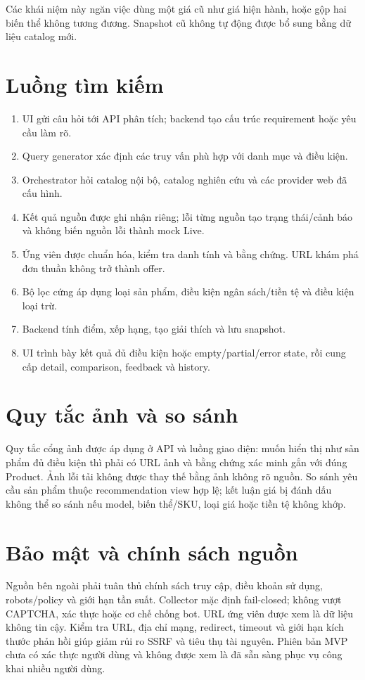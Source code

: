 Các khái niệm này ngăn việc dùng một giá cũ như giá hiện hành, hoặc gộp hai biến thể không tương đương. Snapshot cũ không tự động được bổ sung bằng dữ liệu catalog mới.

\section{Luồng tìm kiếm}

\begin{enumerate}
  \item UI gửi câu hỏi tới API phân tích; backend tạo cấu trúc requirement hoặc yêu cầu làm rõ.
  \item Query generator xác định các truy vấn phù hợp với danh mục và điều kiện.
  \item Orchestrator hỏi catalog nội bộ, catalog nghiên cứu và các provider web đã cấu hình.
  \item Kết quả nguồn được ghi nhận riêng; lỗi từng nguồn tạo trạng thái/cảnh báo và không biến nguồn lỗi thành mock Live.
  \item Ứng viên được chuẩn hóa, kiểm tra danh tính và bằng chứng. URL khám phá đơn thuần không trở thành offer.
  \item Bộ lọc cứng áp dụng loại sản phẩm, điều kiện ngân sách/tiền tệ và điều kiện loại trừ.
  \item Backend tính điểm, xếp hạng, tạo giải thích và lưu snapshot.
  \item UI trình bày kết quả đủ điều kiện hoặc empty/partial/error state, rồi cung cấp detail, comparison, feedback và history.
\end{enumerate}

\section{Quy tắc ảnh và so sánh}

Quy tắc cổng ảnh được áp dụng ở API và luồng giao diện: muốn hiển thị như sản phẩm đủ điều kiện thì phải có URL ảnh và bằng chứng xác minh gắn với đúng Product. Ảnh lỗi tải không được thay thế bằng ảnh không rõ nguồn. So sánh yêu cầu sản phẩm thuộc recommendation view hợp lệ; kết luận giá bị đánh dấu không thể so sánh nếu model, biến thể/SKU, loại giá hoặc tiền tệ không khớp.

\section{Bảo mật và chính sách nguồn}

Nguồn bên ngoài phải tuân thủ chính sách truy cập, điều khoản sử dụng, robots/policy và giới hạn tần suất. Collector mặc định fail-closed; không vượt CAPTCHA, xác thực hoặc cơ chế chống bot. URL ứng viên được xem là dữ liệu không tin cậy. Kiểm tra URL, địa chỉ mạng, redirect, timeout và giới hạn kích thước phản hồi giúp giảm rủi ro SSRF và tiêu thụ tài nguyên. Phiên bản MVP chưa có xác thực người dùng và không được xem là đã sẵn sàng phục vụ công khai nhiều người dùng.
